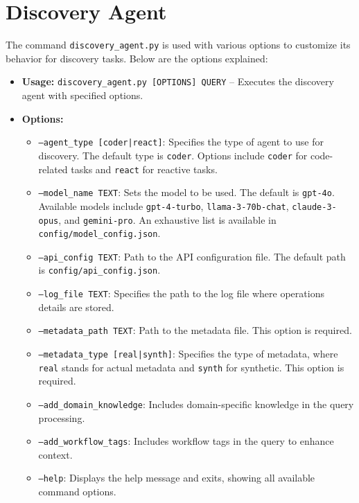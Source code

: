 \section{Discovery Agent}


The command \texttt{discovery\_agent.py} is used with various options to customize its behavior for discovery tasks. Below are the options explained:

\begin{itemize}[leftmargin=*]
    \item \textbf{Usage:} \texttt{discovery\_agent.py [OPTIONS] QUERY} -- Executes the discovery agent with specified options.

    \item \textbf{Options:}
    \begin{itemize}
        \item \texttt{--agent\_type [coder|react]}: Specifies the type of agent to use for discovery. The default type is \texttt{coder}. Options include \texttt{coder} for code-related tasks and \texttt{react} for reactive tasks.
        
        \item \texttt{--model\_name TEXT}: Sets the model to be used. The default is \texttt{gpt-4o}. Available models include \texttt{gpt-4-turbo}, \texttt{llama-3-70b-chat}, \texttt{claude-3-opus}, and \texttt{gemini-pro}. An exhaustive list is available in \texttt{config/model\_config.json}.
        
        \item \texttt{--api\_config TEXT}: Path to the API configuration file. The default path is \texttt{config/api\_config.json}.
        
        \item \texttt{--log\_file TEXT}: Specifies the path to the log file where operations details are stored.
        
        \item \texttt{--metadata\_path TEXT}: Path to the metadata file. This option is required.
        
        \item \texttt{--metadata\_type [real|synth]}: Specifies the type of metadata, where \texttt{real} stands for actual metadata and \texttt{synth} for synthetic. This option is required.
        
        \item \texttt{--add\_domain\_knowledge}: Includes domain-specific knowledge in the query processing.
        
        \item \texttt{--add\_workflow\_tags}: Includes workflow tags in the query to enhance context.
        
        \item \texttt{--help}: Displays the help message and exits, showing all available command options.
    \end{itemize}
\end{itemize}

